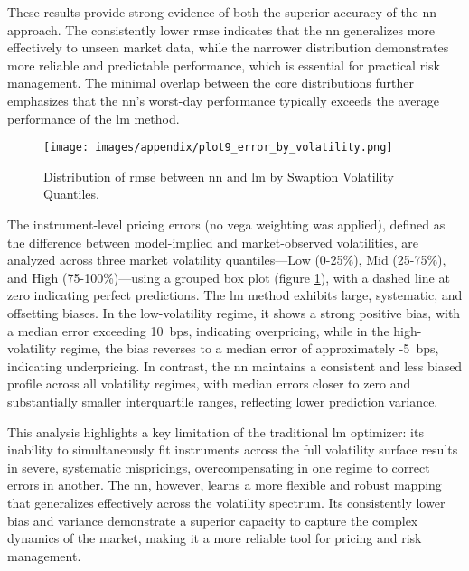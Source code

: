These results provide strong evidence of both the superior accuracy of the \ac{nn} approach. The consistently lower \ac{rmse} indicates that the \ac{nn} generalizes more effectively to unseen market data, while the narrower distribution demonstrates more reliable and predictable performance, which is essential for practical risk management. The minimal overlap between the core distributions further emphasizes that the \ac{nn}'s worst-day performance typically exceeds the average performance of the \ac{lm} method.

\begin{figure}[H]
	\centering
	\texttt{[image: images/appendix/plot9\_error\_by\_volatility.png]}
	\caption{Distribution of \ac{rmse} between \ac{nn} and \ac{lm} by Swaption Volatility Quantiles.}
	\label{fig:distribution_rmse_by_swaption_volatility_quantile}
\end{figure}
The instrument-level pricing errors (no vega weighting was applied), defined as the difference between model-implied and market-observed volatilities, are analyzed across three market volatility quantiles—Low (0-25\%), Mid (25-75\%), and High (75-100\%)—using a grouped box plot (figure \ref{fig:distribution_rmse_by_swaption_volatility_quantile}), with a dashed line at zero indicating perfect predictions. The \ac{lm} method exhibits large, systematic, and offsetting biases. In the low-volatility regime, it shows a strong positive bias, with a median error exceeding 10~\ac{bps}, indicating overpricing, while in the high-volatility regime, the bias reverses to a median error of approximately -5~\ac{bps}, indicating underpricing. In contrast, the \ac{nn} maintains a consistent and less biased profile across all volatility regimes, with median errors closer to zero and substantially smaller interquartile ranges, reflecting lower prediction variance.

This analysis highlights a key limitation of the traditional \ac{lm} optimizer: its inability to simultaneously fit instruments across the full volatility surface results in severe, systematic mispricings, overcompensating in one regime to correct errors in another. The \ac{nn}, however, learns a more flexible and robust mapping that generalizes effectively across the volatility spectrum. Its consistently lower bias and variance demonstrate a superior capacity to capture the complex dynamics of the market, making it a more reliable tool for pricing and risk management.

